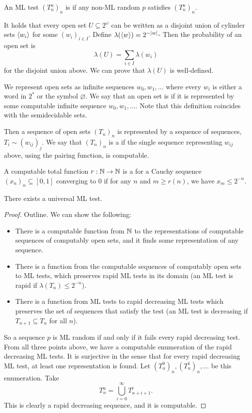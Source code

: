 
\begin{definition}
  An ML test $(T_n^u)_n$ is  if any non-ML random $p$ satisfies
  $(T_n^u)_n$.
\end{definition}

It holds that every open set $U \subseteq 2^\omega$ can be written as a disjoint
union of cylinder sets $\left< w_i \right>$ for some $(w_i)_{i \in I}$.
Define $\lambda(\left< w \right>) = 2^{-\left| w \right|}$-
Then the probability of an open set is
\[
  \lambda(U) = \sum_{i \in I} \lambda(w_i)
\]
for the disjoint union above.
We can prove that $\lambda(U)$ is well-defined.

We represent open sets as infinite sequences $w_0, w_1, \ldots$ where every
$w_i$ is either a word in $2^*$ or the symbol $\varnothing$.
We say that an open set is  if it is represented by some
computable infinite sequence $w_0, w_1, \ldots$.
Note that this definition coincides with the semidecidable sets.

Then a sequence of open sets $(T_n)_n$ is represented by a sequence of
sequences, $T_i \sim (w_{ij})_j$.
We say that $(T_n)_n$ is a  if
the single sequence representing $w_{ij}$ above, using the pairing function, is
computable.

A computable total function $r: \mathbb{N} \to \mathbb{N}$ is a  for a Cauchy sequence $(x_n)_n \subseteq [0,1]$ converging to $0$
if for any $n$ and $m \ge r(n)$, we have $x_m \le 2^{-n}$.

\begin{theorem}
  There exists a universal ML test.
\end{theorem}

\begin{proof}
  Outline.
  We can show the following:
  \begin{itemize}
  \item There is a computable function from $\mathbb{N}$ to the representations of
	computable sequences of computably open sets, and it finds some
	representation of any sequence.
  \item There is a function from the computable sequences of computably open
	sets to ML tests, which preserves rapid ML tests in its domain
	(an ML test is rapid if $\lambda(T_n) \le 2^{-n}$).
  \item There is a function from ML tests to rapid decreasing ML tests which
	preserves the set of sequences that satisfy the test
	(an ML test is decreasing if $T_{n+1} \subseteq T_n$ for all $n$).
  \end{itemize}
  So a sequence $p$ is ML random if and only if it fails every rapid decreasing
  test.
  From all three points above, we have a computable enumeration of the rapid
  decreasing ML tests.
  It is surjective in the sense that for every rapid decreasing ML test, at
  least one representation is found.
  Let $(T_n^0)_n, (T_n^1)_n, \ldots$ be this enumeration.
  Take
  \[
	T_n^u = \bigcup_{i=0}^\infty T_{n+i+1}^i.
  \]
  This is clearly a rapid decreasing sequence, and it is computable.
\end{proof}


